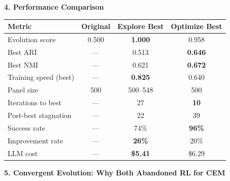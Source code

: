 \documentclass[8pt]{article}
\begin{document}
\vspace{4pt}

{\large\bfseries 4. Performance Comparison}

\vspace{3pt}

\renewcommand{\arraystretch}{1.25}
\begin{table}[ht]
\centering
\small
\begin{tabular}{@{}l c c c@{}}
\toprule
\textbf{Metric} & \textbf{Original} & \textbf{Explore Best} & \textbf{Optimize Best} \\
\midrule
Evolution score & 0.500 & \textbf{1.000} & 0.958 \\
Best ARI & --- & 0.513 & \textbf{0.646} \\
Best NMI & --- & 0.621 & \textbf{0.672} \\
Training speed (best) & --- & \textbf{0.825} & 0.640 \\
Panel size & 500 & 500--548 & 500 \\
\addlinespace
Iterations to best & --- & 27 & \textbf{10} \\
Post-best stagnation & --- & 22 & 39 \\
Success rate & --- & 74\% & \textbf{96\%} \\
Improvement rate & --- & \textbf{26\%} & 20\% \\
LLM cost & --- & \textbf{\$5.41} & \$6.29 \\
\bottomrule
\end{tabular}
\end{table}

\vspace{4pt}

{\large\bfseries 5. Convergent Evolution: Why Both Abandoned RL for CEM}

\vspace{3pt}
\end{document}
